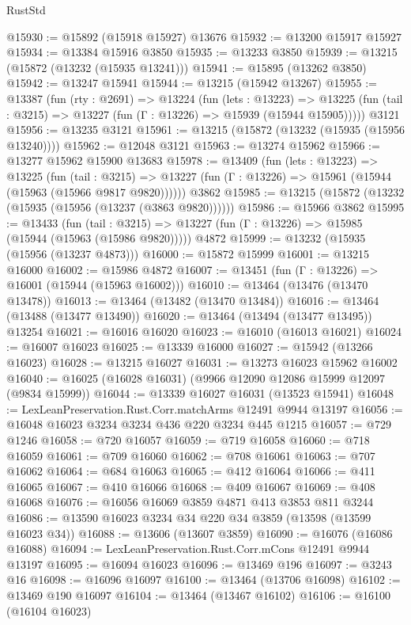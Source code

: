 \begin{lexlean}{RustStd}
\begin{coremodule}
@15930 := @15892 (@15918 @15927) @13676
@15932 := @13200 @15917 @15927
@15934 := @13384 @15916 @3850
@15935 := @13233 @3850
@15939 := @13215 (@15872 (@13232 (@15935 @13241)))
@15941 := @15895 (@13262 @3850)
@15942 := @13247 @15941
@15944 := @13215 (@15942 @13267)
@15955 := @13387
    (fun (rty : @2691) =>
    @13224
      (fun (lets : @13223) =>
      @13225 (fun (tail : @3215) => @13227 (fun (Γ : @13226) => @15939 (@15944 @15905)))))
    @3121
@15956 := @13235 @3121
@15961 := @13215 (@15872 (@13232 (@15935 (@15956 @13240))))
@15962 := @12048 @3121
@15963 := @13274 @15962
@15966 := @13277 @15962 @15900 @13683
@15978 := @13409
    (fun (lets : @13223) =>
    @13225
      (fun (tail : @3215) =>
      @13227 (fun (Γ : @13226) => @15961 (@15944 (@15963 (@15966 @9817 @9820))))))
    @3862
@15985 := @13215 (@15872 (@13232 (@15935 (@15956 (@13237 (@3863 @9820))))))
@15986 := @15966 @3862
@15995 := @13433
    (fun (tail : @3215) => @13227 (fun (Γ : @13226) => @15985 (@15944 (@15963 (@15986 @9820)))))
    @4872
@15999 := @13232 (@15935 (@15956 (@13237 @4873)))
@16000 := @15872 @15999
@16001 := @13215 @16000
@16002 := @15986 @4872
@16007 := @13451 (fun (Γ : @13226) => @16001 (@15944 (@15963 @16002)))
@16010 := @13464 (@13476 (@13470 @13478))
@16013 := @13464 (@13482 (@13470 @13484))
@16016 := @13464 (@13488 (@13477 @13490))
@16020 := @13464 (@13494 (@13477 @13495)) @13254
@16021 := @16016 @16020
@16023 := @16010 (@16013 @16021)
@16024 := @16007 @16023
@16025 := @13339 @16000
@16027 := @15942 (@13266 @16023)
@16028 := @13215 @16027
@16031 := @13273 @16023 @15962 @16002
@16040 := @16025 (@16028 @16031) (@9966 @12090 @12086 @15999 @12097 (@9834 @15999))
@16044 := @13339 @16027 @16031 (@13523 @15941)
@16048 := LexLeanPreservation.Rust.Corr.matchArms @12491 @9944 @13197
@16056 := @16048 @16023 @3234 @3234 @436 @220 @3234 @445 @1215
@16057 := @729 @1246
@16058 := @720 @16057
@16059 := @719 @16058
@16060 := @718 @16059
@16061 := @709 @16060
@16062 := @708 @16061
@16063 := @707 @16062
@16064 := @684 @16063
@16065 := @412 @16064
@16066 := @411 @16065
@16067 := @410 @16066
@16068 := @409 @16067
@16069 := @408 @16068
@16076 := @16056 @16069 @3859 @4871 @413 @3853 @811 @3244
@16086 := @13590 @16023 @3234 @34 @220 @34 @3859 (@13598 (@13599 @16023 @34))
@16088 := @13606 (@13607 @3859)
@16090 := @16076 (@16086 @16088)
@16094 := LexLeanPreservation.Rust.Corr.mCons @12491 @9944 @13197
@16095 := @16094 @16023
@16096 := @13469 @196
@16097 := @3243 @16
@16098 := @16096 @16097
@16100 := @13464 (@13706 @16098)
@16102 := @13469 @190 @16097
@16104 := @13464 (@13467 @16102)
@16106 := @16100 (@16104 @16023)

\end{coremodule}
\end{lexlean}
